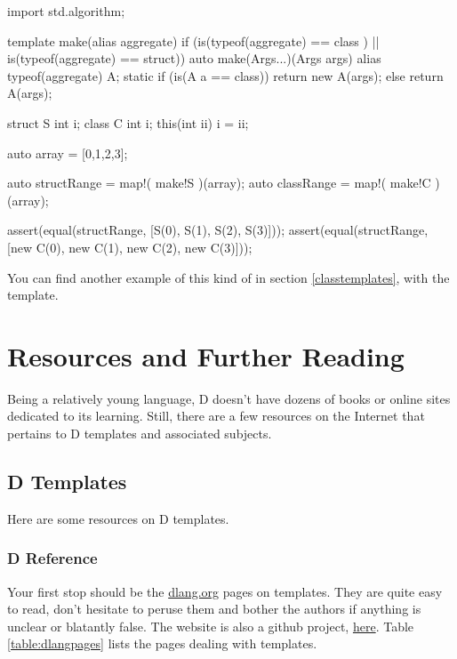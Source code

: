 \begin{dcode}
import std.algorithm;

template make(alias aggregate) 
    if (is(typeof(aggregate) == class ) 
     || is(typeof(aggregate) == struct))
{
    auto make(Args...)(Args args)
    {
        alias typeof(aggregate) A;        
        static if (is(A a == class))
            return new A(args);
        else
            return A(args);
    }
}

struct S {int i;}
class C {int i; this(int ii) { i = ii;}}

auto array = [0,1,2,3];

auto structRange = map!( make!S )(array);
auto classRange  = map!( make!C )(array);

assert(equal(structRange, [S(0), S(1), S(2), S(3)]));
assert(equal(structRange, [new C(0), new C(1), new C(2), new C(3)]));
\end{dcode}

You can find another example of this kind of  in section \ref{classtemplates}, with the  template.

\section{Resources and Further Reading}
\label{resources}


Being a relatively young language, D doesn't have dozens of books or online sites dedicated to its learning. Still, there are a few resources on the Internet that pertains to D templates and associated subjects.

\subsection{D Templates}

Here are some resources on D templates.

\subsubsection{D Reference}
\label{dreference}

Your first stop should be the \href{http://dlang.org}{dlang.org} pages on templates. They are quite easy to read, don't hesitate to peruse them and bother the authors if anything is unclear or blatantly false. The  website is also a github project, \href{https://github.com/D-Programming-Language/d-programming-language.org}{here}. Table \ref{table:dlangpages} lists the pages dealing with templates.

